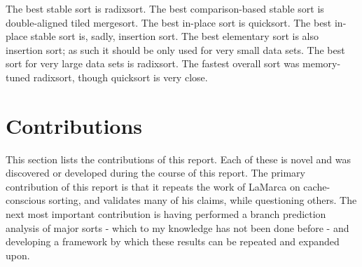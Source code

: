 
The best stable sort is radixsort. The best comparison-based stable sort is
double-aligned tiled mergesort. The best in-place sort is quicksort. The best in-place
stable sort is, sadly, insertion sort. The best elementary sort is also
insertion sort; as such it should be only used for very small data sets. The
best sort for very large data sets is radixsort. The fastest overall sort was
memory-tuned radixsort, though quicksort is very close.

\section{Contributions}

This section lists the contributions of this report. Each of these is novel  
and was discovered or developed during the course of this report.
The primary contribution of this report is that it repeats the work of LaMarca
on cache-conscious sorting, and validates many of his claims, while questioning
others. The next most important contribution is having performed a branch
prediction analysis of major sorts - which to my knowledge has not been done
before - and developing a framework by which these results can be repeated and
expanded upon.

